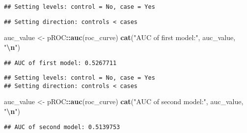 \documentclass[
]{article}
\newenvironment{Shaded}{\begin{snugshade}}{\end{snugshade}}
\newcommand{\AttributeTok}[1]{\textcolor[rgb]{0.13,0.29,0.53}{#1}}
\newcommand{\FunctionTok}[1]{\textcolor[rgb]{0.13,0.29,0.53}{\textbf{#1}}}
\newcommand{\NormalTok}[1]{#1}
\newcommand{\OtherTok}[1]{\textcolor[rgb]{0.56,0.35,0.01}{#1}}
\newcommand{\SpecialCharTok}[1]{\textcolor[rgb]{0.81,0.36,0.00}{\textbf{#1}}}
\newcommand{\StringTok}[1]{\textcolor[rgb]{0.31,0.60,0.02}{#1}}
\begin{document}
\begin{verbatim}
## Setting levels: control = No, case = Yes
\end{verbatim}

\begin{verbatim}
## Setting direction: controls < cases
\end{verbatim}

\begin{Shaded}
\begin{Highlighting}[]
\NormalTok{auc\_value }\OtherTok{\textless{}{-}}\NormalTok{ pROC}\SpecialCharTok{::}\FunctionTok{auc}\NormalTok{(roc\_curve)}
\FunctionTok{cat}\NormalTok{(}\StringTok{"AUC of first model:"}\NormalTok{, auc\_value, }\StringTok{"}\SpecialCharTok{\textbackslash{}n}\StringTok{"}\NormalTok{)}
\end{Highlighting}
\end{Shaded}

\begin{verbatim}
## AUC of first model: 0.5267711
\end{verbatim}

\begin{Shaded}
\end{Shaded}

\begin{verbatim}
## Setting levels: control = No, case = Yes
## Setting direction: controls < cases
\end{verbatim}

\begin{Shaded}
\begin{Highlighting}[]
\NormalTok{auc\_value }\OtherTok{\textless{}{-}}\NormalTok{ pROC}\SpecialCharTok{::}\FunctionTok{auc}\NormalTok{(roc\_curve)}
\FunctionTok{cat}\NormalTok{(}\StringTok{"AUC of second model:"}\NormalTok{, auc\_value, }\StringTok{"}\SpecialCharTok{\textbackslash{}n}\StringTok{"}\NormalTok{)}
\end{Highlighting}
\end{Shaded}

\begin{verbatim}
## AUC of second model: 0.5139753
\end{verbatim}
\end{document}
